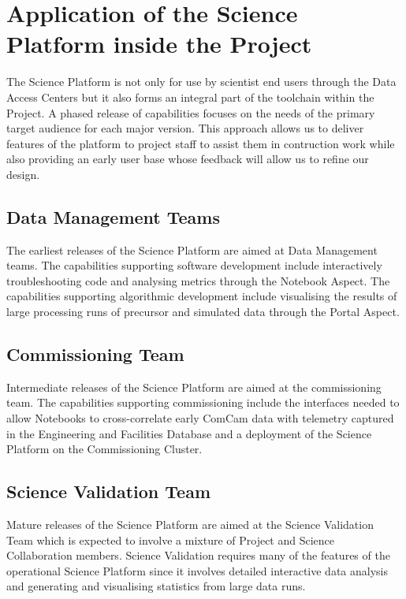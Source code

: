 \section{Application of the Science Platform inside the Project}\label{application-of-the-science-platform-inside-the-project}

The Science Platform is not only for use by scientist end users through the Data Access Centers but it also forms an integral part of the toolchain within the Project. A phased release of capabilities focuses on the needs of the primary target audience for each major version. This approach allows us to deliver features of the platform to project staff to assist them in contruction work while also providing an early user base whose feedback will allow us to refine our design.

\subsection{Data Management Teams}\label{developer-support}

The earliest releases of the Science Platform are aimed at Data Management teams. The capabilities supporting software development include interactively troubleshooting code and analysing metrics through the Notebook Aspect. The capabilities supporting algorithmic development include visualising the results of large processing runs of precursor and simulated data through the Portal Aspect.

\subsection{Commissioning Team}\label{commissioning}

Intermediate releases of the Science Platform are aimed at the commissioning team. The capabilities supporting commissioning include the interfaces needed to allow Notebooks to cross-correlate early ComCam data with telemetry captured in the Engineering and Facilities Database and a deployment of the Science Platform on the Commissioning Cluster.

\subsection{Science Validation Team}

Mature releases of the Science Platform are aimed at the Science Validation Team which is expected to involve a mixture of Project and Science Collaboration members. Science Validation requires many of the features of the operational Science Platform since it involves detailed interactive data analysis and generating and visualising statistics from large data runs.

